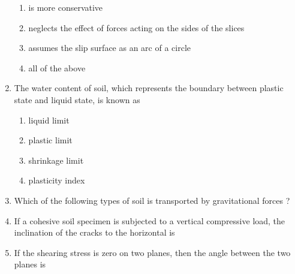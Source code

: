 \documentclass[11pt,a4paper]{article}
\begin{document}
\begin{enumerate}
{}
\begin{enumerate}[label=\Alph*.]
\item{is more conservative}
\item{neglects the effect of forces acting on the sides of the slices}
\item{assumes the slip surface as an arc of a circle}
\item{all of the above}
\end{enumerate}
\item{The water content of soil, which represents the boundary between plastic state and liquid state, is known as}
\begin{enumerate}[label=\Alph*.]
\item{liquid limit}
\item{plastic limit}
\item{shrinkage limit}
\item{plasticity index}
\end{enumerate}
\item{Which of the following types of soil is transported by gravitational forces ?}
\\
\item{If a cohesive soil specimen is subjected to a vertical compressive load, the inclination of the cracks to the horizontal is}
\\
\item{If the shearing stress is zero on two planes, then the angle between the two planes is}
\\
\end{enumerate}
\end{document}
